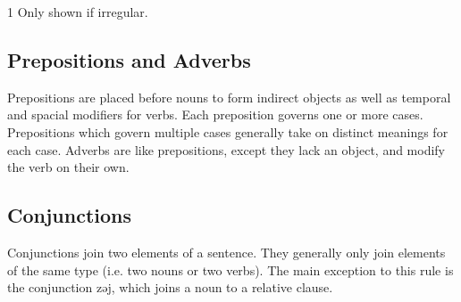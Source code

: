 \begin{table}[h]
\centering
\caption{Numbers}
\label{tab:numbers}
\begin{threeparttable}
\begin{tablenotes}
\item[1] Only shown if irregular.
\end{tablenotes}
\end{threeparttable}
\end{table}

\subsection{Prepositions and Adverbs}
Prepositions are placed before nouns to form indirect objects as well as
temporal and spacial modifiers for verbs. Each preposition governs one or more
cases. Prepositions which govern multiple cases generally take on distinct
meanings for each case. Adverbs are like prepositions, except they lack an
object, and modify the verb on their own.

\subsection{Conjunctions}
Conjunctions join two elements of a sentence. They generally only join elements
of the same type (i.e. two nouns or two verbs). The main exception to this rule
is the conjunction {\ll zəj}, which joins a noun to a relative clause.

